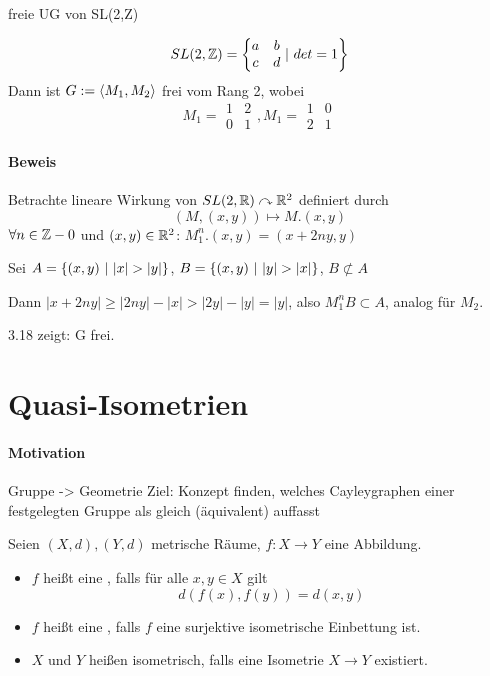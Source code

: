 \documentclass{article}
\begin{document}
\Bsp{}
freie UG von SL(2,Z)

\[SL(2,\Z) = \set{\begin{matrix}
	a & b\\
	c & d\\
	\end{matrix}}{det = 1}\]
Dann ist $G:= \grp{M_1, M_2}{}$ frei vom Rang 2, wobei 
\[M_1 =\begin{matrix}
1 & 2\\
0 & 1
\end{matrix}, M_1 =\begin{matrix}
1 & 0\\
2 & 1
\end{matrix}\]

\paragraph{Beweis}
Betrachte lineare Wirkung von $SL(2,\mathbb{R}) \curvearrowright \mathbb{R}^2$ definiert durch
\[(M, (x,y)) \longmapsto M.(x,y)\]
$\forall n \in \mathbb{Z} - 0$ und $(x,y) \in \mathbb{R}^2$: $M_1^n.(x,y) = (x+2ny,y)$

Sei $A = \set{(x,y)}{|x| > |y|}$, 
 $B = \set{(x,y)}{|y| > |x|}$,  $B \not \subset A$

Dann $|x + 2ny| \geq |2ny| - |x| > |2y| - |y| = |y|$, also $M_1^nB \subset A$, analog für $M_2$.

3.18 zeigt: G frei.



\newpage
\section{Quasi-Isometrien}

\paragraph{Motivation}
Gruppe -> Geometrie
Ziel: Konzept finden, welches Cayleygraphen einer festgelegten Gruppe als gleich (äquivalent) auffasst

\Def{}
Seien $(X,d),(Y,d)$ metrische Räume, $f:X\rightarrow Y$ eine Abbildung.
\begin{itemize}
	\item $f$ heißt eine , falls für alle $x,y \in X$ gilt
	\[d(f(x),f(y)) = d(x,y) \]
	\item $f$ heißt eine , falls $f$ eine surjektive isometrische Einbettung ist.
	\item $X$ und $Y$ heißen isometrisch, falls eine Isometrie $X\rightarrow Y$ existiert.
\end{itemize}
\end{document}
